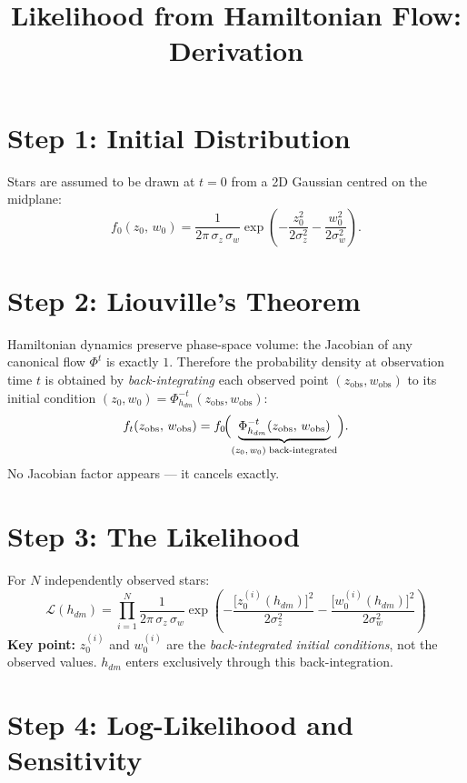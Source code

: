 \documentclass[12pt]{article}
\title{Likelihood from Hamiltonian Flow: Derivation}
\author{}
\date{}
\begin{document}
\maketitle

\section*{Step 1: Initial Distribution}

Stars are assumed to be drawn at $t=0$ from a 2D Gaussian centred on the midplane:
\[
  f_0(z_0,\, w_0)
  = \frac{1}{2\pi\,\sigma_z\,\sigma_w}
    \exp\!\left(-\frac{z_0^{2}}{2\sigma_z^{2}} - \frac{w_0^{2}}{2\sigma_w^{2}}\right).
\]

\section*{Step 2: Liouville's Theorem}

Hamiltonian dynamics preserve phase-space volume: the Jacobian of any canonical
flow $\Phi^t$ is exactly $1$.  Therefore the probability density at observation
time $t$ is obtained by \emph{back-integrating} each observed point
$(z_\mathrm{obs},w_\mathrm{obs})$ to its initial condition
$(z_0, w_0) = \Phi^{-t}_{h_{dm}}(z_\mathrm{obs}, w_\mathrm{obs})$:
\[
  f_t\!\left(z_\mathrm{obs},\, w_\mathrm{obs}\right)
  = f_0\!\Bigl(\underbrace{\Phi^{-t}_{h_{dm}}(z_\mathrm{obs},\, w_\mathrm{obs})}_{%
      (z_0,\,w_0)\;\text{back-integrated}}\Bigr).
\]
No Jacobian factor appears — it cancels exactly.

\section*{Step 3: The Likelihood}

For $N$ independently observed stars:
\[
\boxed{
  \mathcal{L}(h_{dm})
  = \prod_{i=1}^{N}
    \frac{1}{2\pi\,\sigma_z\,\sigma_w}
    \exp\!\left(-\frac{\bigl[z_0^{(i)}(h_{dm})\bigr]^{2}}{2\sigma_z^{2}}
                -\frac{\bigl[w_0^{(i)}(h_{dm})\bigr]^{2}}{2\sigma_w^{2}}\right)
}
\]
\textbf{Key point:} $z_0^{(i)}$ and $w_0^{(i)}$ are the \emph{back-integrated initial conditions},
not the observed values.  $h_{dm}$ enters exclusively through this back-integration.

\section*{Step 4: Log-Likelihood and Sensitivity}
\end{document}
